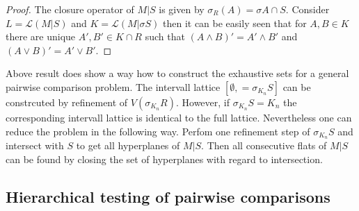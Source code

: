 \documentclass[a4paper,12pt]{article}
\newtheorem{theorem}{Theorem}
\begin{document}
\begin{proof}
  The closure operator of $M|S$ is given by $\sigma_R(A) = \sigma A
  \cap S$. Consider $L = \mathcal{L}(M|S)$ and $K = \mathcal{L}(M|\sigma
  S)$ then it can be easily seen that for $A,B \in K$ there are unique $A',B'
  \in K \cap R$ such that $(A \land B)' = A' \land B'$ and $(A
  \lor B)' = A' \lor B'$. 
\end{proof}

Above result does show a way how to construct the exhaustive sets for
a general pairwise comparison problem. The intervall lattice
$[\emptyset,=\sigma_{K_n} S]$ can be constrcuted by refinement of
$V(\sigma_{K_n} R)$.  However, if $\sigma_{K_n} S = K_n$ the
corresponding intervall lattice is identical to the full
lattice. Nevertheless one can reduce the problem in the following
way. Perfom one refinement step of $\sigma_{K_n} S$ and intersect with
$S$ to get all hyperplanes of $M|S$. Then all consecutive flats of
$M|S$ can be found by closing the set of hyperplanes with regard to
intersection.

\subsection{Hierarchical testing of pairwise comparisons}


\end{document}
